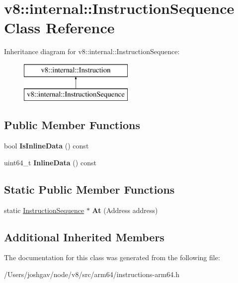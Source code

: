 \hypertarget{classv8_1_1internal_1_1_instruction_sequence}{}\section{v8\+:\+:internal\+:\+:Instruction\+Sequence Class Reference}
\label{classv8_1_1internal_1_1_instruction_sequence}
Inheritance diagram for v8\+:\+:internal\+:\+:Instruction\+Sequence\+:\begin{figure}[H]
\begin{center}
\leavevmode
\includegraphics[height=2.000000cm]{classv8_1_1internal_1_1_instruction_sequence}
\end{center}
\end{figure}
\subsection*{Public Member Functions}
\begin{DoxyCompactItemize}
\item 
bool {\bfseries Is\+Inline\+Data} () const \hypertarget{classv8_1_1internal_1_1_instruction_sequence_a0c5547675f7adf6ce5e9a633c038cbf7}{}\label{classv8_1_1internal_1_1_instruction_sequence_a0c5547675f7adf6ce5e9a633c038cbf7}

\item 
uint64\+\_\+t {\bfseries Inline\+Data} () const \hypertarget{classv8_1_1internal_1_1_instruction_sequence_ad038a11400714b2e353334e0158f33ed}{}\label{classv8_1_1internal_1_1_instruction_sequence_ad038a11400714b2e353334e0158f33ed}

\end{DoxyCompactItemize}
\subsection*{Static Public Member Functions}
\begin{DoxyCompactItemize}
\item 
static \hyperlink{classv8_1_1internal_1_1_instruction_sequence}{Instruction\+Sequence} $\ast$ {\bfseries At} (Address address)\hypertarget{classv8_1_1internal_1_1_instruction_sequence_aa17d0fabb0be85c86b49288b7159fdd5}{}\label{classv8_1_1internal_1_1_instruction_sequence_aa17d0fabb0be85c86b49288b7159fdd5}

\end{DoxyCompactItemize}
\subsection*{Additional Inherited Members}


The documentation for this class was generated from the following file\+:\begin{DoxyCompactItemize}
\item 
/\+Users/joshgav/node/v8/src/arm64/instructions-\/arm64.\+h\end{DoxyCompactItemize}
